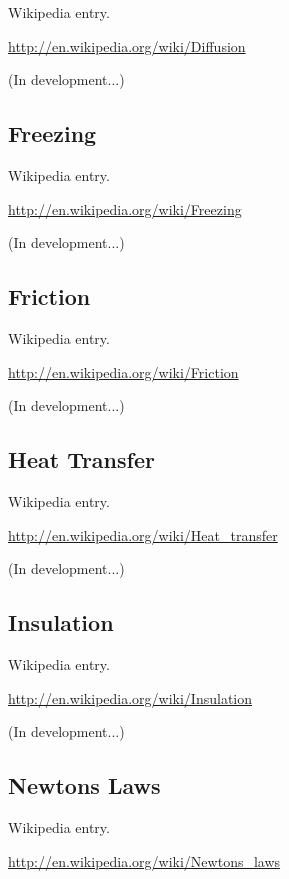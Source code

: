\documentclass[12pt,twoside]{book}
\begin{document}
Wikipedia entry.

\href{http://en.wikipedia.org/wiki/Diffusion}{http://en.wikipedia.org/wiki/Diffusion}

(In development...)

\subsection[Freezing]{Freezing}

Wikipedia entry.

\href{http://en.wikipedia.org/wiki/Freezing}{http://en.wikipedia.org/wiki/Freezing}

(In development...)

\subsection[Friction]{Friction}

Wikipedia entry.

\href{http://en.wikipedia.org/wiki/Friction}{http://en.wikipedia.org/wiki/Friction}

(In development...)

\subsection[Heat Transfer]{Heat Transfer}

Wikipedia entry.

\href{http://en.wikipedia.org/wiki/Heat_transfer}{http://en.wikipedia.org/wiki/Heat\_transfer}

(In development...)

\subsection[Insulation]{Insulation}

Wikipedia entry.

\href{http://en.wikipedia.org/wiki/Insulation}{http://en.wikipedia.org/wiki/Insulation}

(In development...)

\subsection[Newton{\textquotesingle}s Laws]{ Newton{\textquotesingle}s Laws}

Wikipedia entry.

\href{http://en.wikipedia.org/wiki/Newtons_laws}{http://en.wikipedia.org/wiki/Newtons\_laws}
\end{document}

